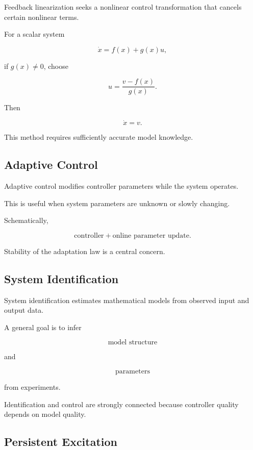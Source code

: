 Feedback linearization seeks a nonlinear control transformation that cancels
certain nonlinear terms.

For a scalar system

\[
\dot{x}
=
f(x)+g(x)u,
\]

if \(g(x)\neq0\), choose

\[
\boxed{
u
=
\frac{
v-f(x)
}{
g(x)
}.
}
\]

Then

\[
\boxed{
\dot{x}=v.
}
\]

This method requires sufficiently accurate model knowledge.

\subsection{Adaptive Control}
\label{subsec:adaptive-control}

Adaptive control modifies controller parameters while the system operates.

This is useful when system parameters are unknown or slowly changing.

Schematically,

\[
\boxed{
\text{controller}
+
\text{online parameter update}.
}
\]

Stability of the adaptation law is a central concern.

\subsection{System Identification}
\label{subsec:system-identification-control}

System identification estimates mathematical models from observed input and
output data.

A general goal is to infer

\[
\boxed{
\text{model structure}
}
\]

and

\[
\boxed{
\text{parameters}
}
\]

from experiments.

Identification and control are strongly connected because controller quality
depends on model quality.

\subsection{Persistent Excitation}
\label{subsec:persistent-excitation}

